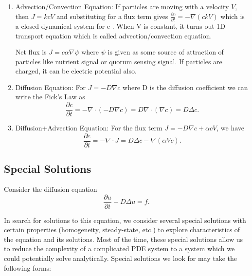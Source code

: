 \documentclass[]{article}
\numberwithin{equation}{section}		%
\begin{document}
  \begin{enumerate}
  \item Advection/Convection Equation: If particles are moving with a velocity $V$, then $J= k c V$ and substituting for a flux term gives $\frac{\partial c}{\partial t} = -\nabla (c k V)$ which is a closed dynamical system for c . When V is constant, it turns out 1D transport equation which is called advection/convection equation.

Net flux is  $J=c \alpha \nabla \psi $ where $\psi$ is given as some source of attraction of particles like nutrient signal or quorum sensing signal. If particles are charged, it can be electric potential also.

\item Diffusion Equation: For $J= -D \nabla c$ where D is the diffusion coefficient we can write the Fick's Law as
\begin{equation}
\frac{\partial c}{\partial t}= -\nabla \cdot(-D \nabla c)= D \nabla\cdot(\nabla c)= D \Delta c.
\end{equation}

\item  Diffusion+Advection Equation:  For the flux term $J=-D \nabla c +\alpha c V$, we have
\begin{equation}
\frac{\partial c}{\partial t}= -\nabla \cdot J= D \Delta c -\nabla (\alpha V c).
\end{equation}
\end{enumerate}

\subsection{Special Solutions}
Consider the diffusion equation
\begin{equation}
\frac{\partial u}{\partial t} - D \Delta u=f.
\end{equation}

In search for solutions to this equation, we consider several special solutions with certain properties (homogeneity, steady-state, etc.) to explore characteristics of the equation and its solutions. Most of the time, these special solutions allow us to reduce the complexity of a complicated PDE system to a system which we could potentially solve analytically. Special solutions we look for may take the following forms:
\end{document}
